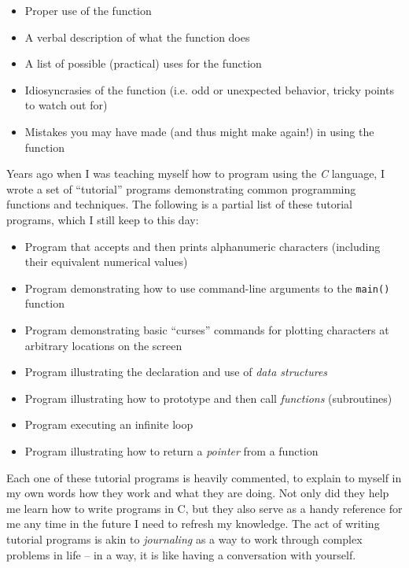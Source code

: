 \begin{itemize}
\item Proper use of the function
\item A verbal description of what the function does
\item A list of possible (practical) uses for the function
\item Idiosyncrasies of the function (i.e. odd or unexpected behavior, tricky points to watch out for)
\item Mistakes you may have made (and thus might make again!) in using the function
\end{itemize}


\vskip 10pt

\filbreak

Years ago when I was teaching myself how to program using the \textit{C} language, I wrote a set of ``tutorial'' programs demonstrating common programming functions and techniques.  The following is a partial list of these tutorial programs, which I still keep to this day:

\begin{itemize}
\item Program that accepts and then prints alphanumeric characters (including their equivalent numerical values)
\item Program demonstrating how to use command-line arguments to the \texttt{main()} function
\item Program demonstrating basic ``curses'' commands for plotting characters at arbitrary locations on the screen
\item Program illustrating the declaration and use of \textit{data structures}
\item Program illustrating how to prototype and then call \textit{functions} (subroutines)
\item Program executing an infinite loop 
\item Program illustrating how to return a \textit{pointer} from a function 
\end{itemize}

Each one of these tutorial programs is heavily commented, to explain to myself in my own words how they work and what they are doing.  Not only did they help me learn how to write programs in C, but they also serve as a handy reference for me any time in the future I need to refresh my knowledge.  The act of writing tutorial programs is akin to \textit{journaling} as a way to work through complex problems in life -- in a way, it is like having a conversation with yourself.








